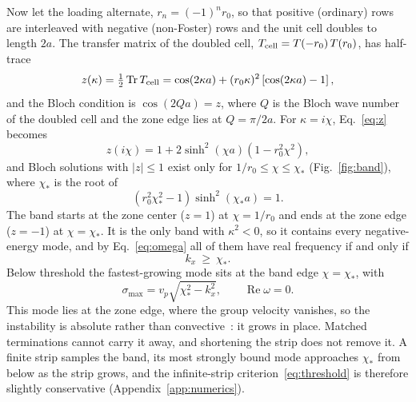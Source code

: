 \documentclass[aps,prapplied,twocolumn,superscriptaddress,floatfix,longbibliography]{revtex4-2}
\begin{document}
Now let the loading alternate, $r_n=(-1)^nr_0$, so that positive (ordinary) rows are interleaved with negative (non-Foster) rows and the unit cell doubles to length $2a$. The transfer matrix of the doubled cell, $T_{\rm cell}=T(-r_0)\,T(r_0)$, has half-trace
\begin{equation}
z(\kappa)=\tfrac12\operatorname{Tr}T_{\rm cell}=\cos(2\kappa a)+(r_0\kappa)^2\left[\cos(2\kappa a)-1\right],
\label{eq:z}
\end{equation}
and the Bloch condition is $\cos(2Qa)=z$, where $Q$ is the Bloch wave number of the doubled cell and the zone edge lies at $Q=\pi/2a$. For $\kappa=i\chi$, Eq.~\eqref{eq:z} becomes
\begin{equation}
z(i\chi)=1+2\sinh^2(\chi a)\left(1-r_0^2\chi^2\right),
\label{eq:zchi}
\end{equation}
and Bloch solutions with $|z|\le1$ exist only for $1/r_0\le\chi\le\chi_*$ (Fig.~\ref{fig:band}), where $\chi_*$ is the root of
\begin{equation}
\left(r_0^2\chi_*^2-1\right)\sinh^2(\chi_*a)=1 .
\label{eq:chistar}
\end{equation}
The band starts at the zone center ($z=1$) at $\chi=1/r_0$ and ends at the zone edge ($z=-1$) at $\chi=\chi_*$. It is the only band with $\kappa^2<0$, so it contains every negative-energy mode, and by Eq.~\eqref{eq:omega} all of them have real frequency if and only if
\begin{equation}
k_x\ \ge\ \chi_* .
\label{eq:threshold}
\end{equation}
Below threshold the fastest-growing mode sits at the band edge $\chi=\chi_*$, with
\begin{equation}
\sigma_{\max}=v_p\sqrt{\chi_*^2-k_x^2},\qquad \operatorname{Re}\omega=0 .
\label{eq:sigma}
\end{equation}
This mode lies at the zone edge, where the group velocity vanishes, so the instability is absolute rather than convective~\cite{Briggs_1964:book}: it grows in place. Matched terminations cannot carry it away, and shortening the strip does not remove it. A finite strip samples the band, its most strongly bound mode approaches $\chi_*$ from below as the strip grows, and the infinite-strip criterion~\eqref{eq:threshold} is therefore slightly conservative (Appendix~\ref{app:numerics}).
\end{document}

